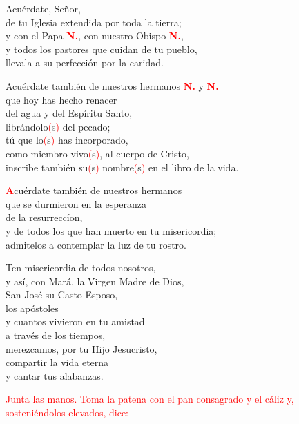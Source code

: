 \documentclass[12pt, letterpaper, spanish]{article}
\begin{document}
  \noindent
  Acu\'erdate, Se\~nor,\\
  de tu Iglesia extendida por toda la tierra; \\
  y con el Papa {\bfseries \textcolor{red}{N.}}, con nuestro Obispo {\bfseries \textcolor{red}{N.}},\\
  y todos los pastores que cuidan de tu pueblo,\\
  llevala a su perfecci\'on por la caridad.

  \noindent
  Acu\'erdate tambi\'en de nuestros hermanos {\bfseries \textcolor{red}{N.}} y {\bfseries \textcolor{red}{N.}} \\
  que hoy has hecho renacer \\
  del agua y del Esp\'iritu Santo, \\
  libr\'andolo\textcolor{red}{(}s\textcolor{red}{)} del pecado; \\
  t\'u que lo\textcolor{red}{(}s\textcolor{red}{)} has incorporado, \\
  como miembro vivo\textcolor{red}{(}s\textcolor{red}{)}, al cuerpo de Cristo, \\
  inscribe tambi\'en su\textcolor{red}{(}s\textcolor{red}{)} nombre\textcolor{red}{(}s\textcolor{red}{)} en el libro de la vida.

  \lettrine[lines=2]{\bfseries \textcolor{red}{A}}{}\Large cu\'erdate tambi\'en de nuestros hermanos\\
  que se durmieron en la esperanza\\
  de la resurrecc\'ion,\\
  y de todos los que han muerto en tu misericordia;\\
  admitelos a contemplar la luz de tu rostro.

  \noindent
  Ten misericordia de todos nosotros,\\
  y as\'i, con Mar\'a, la Virgen Madre de Dios,\\
  San Jos\'e su Casto Esposo, \\
  los ap\'ostoles\\
  y cuantos vivieron en tu amistad\\
  a trav\'es de los tiempos,\\
  merezcamos, por tu Hijo Jesucristo,\\
  compartir la vida eterna\\
  y cantar tus alabanzas. 

  \large{\textcolor{red}{Junta las manos. Toma la patena con el pan consagrado y el c\'aliz y, sosteni\'endolos elevados, dice:}}
  
\end{document}
